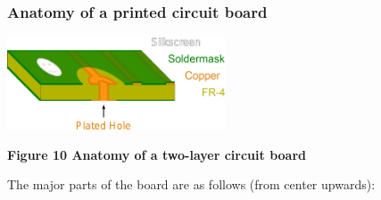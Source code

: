 \documentclass[letterpaper]{article}
\begin{document}
\subsubsection{Anatomy of a printed circuit board}
\hypertarget{Toc337742674}{} \includegraphics[width=2.5382in,height=1.0819in]{figures/ee4document-img003.png} 

{\sffamily\bfseries\color[rgb]{0.30980393,0.5058824,0.7411765}
Figure 10 Anatomy of a two-layer circuit board}

{\sffamily\color[rgb]{0.30980393,0.5058824,0.7411765}
The major parts of the board are as follows (from center upwards):}
\end{document}
